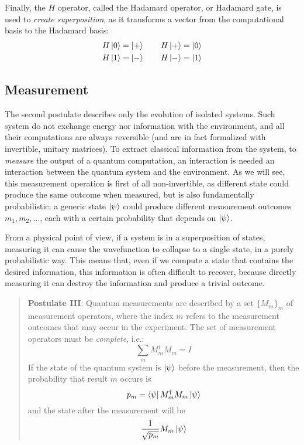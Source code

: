  
Finally, the $H$ operator, called the Hadamard operator, or Hadamard gate, is used to \textit{create superposition}, as it transforms a vector from the computational basis to the Hadamard basis:
\begin{gather*}
	H\ket{0} = \ket{+} \qquad H\ket{+} = \ket{0}  \\
	H\ket{1} = \ket{-} \qquad H\ket{-} = \ket{1} \\	 
\end{gather*}
\subsection{Measurement}

The second postulate describes only the evolution of isolated systems. Such system do not exchange energy nor information with the environment, and all their computations are always reversible (and are in fact formalized with invertible, unitary matrices). To extract classical information from the system, to \textit{measure} the output of a quantum computation, an interaction is needed an interaction between the quantum system and the environment. As we will see, this measurement operation is first of all non-invertible, as different state could produce the same outcome when measured, but is also fundamentally probabilistic: a generic state $\ket{\psi}$ could produce different measurement outcomes $m_1, m_2,\ldots$, each with a certain probability that depends on $\ket{\psi}$.

From a physical point of view, if a system is in a superposition of states, measuring it can  cause the wavefunction to collapse to a single state, in a purely probabilistic way. This means that, even if we compute a state that contains the desired information, this information is often difficult to recover, because directly measuring  it can destroy the information and produce a trivial outcome.

\begin{quote} \textbf{Postulate III}: Quantum measurements are described by a set $\{M_m\}_m$ of measurement operators, where the index $m$ refers to the measurement outcomes that may occur in the experiment. The set of measurement operators must be \textit{complete}, i.e.:
\[\sum_m M_m^\dagger M_m = I\]
If the state of the quantum system is $\ket{\psi}$ before the measurement, then the probability that result $m$ occurs is 
\[p_m = \bra{\psi}M_m^\dagger M_m\ket{\psi}\]
and the state after the measurement will be \[\frac{1}{\sqrt{p_m}}M_m\ket{\psi}\]
\end{quote}

